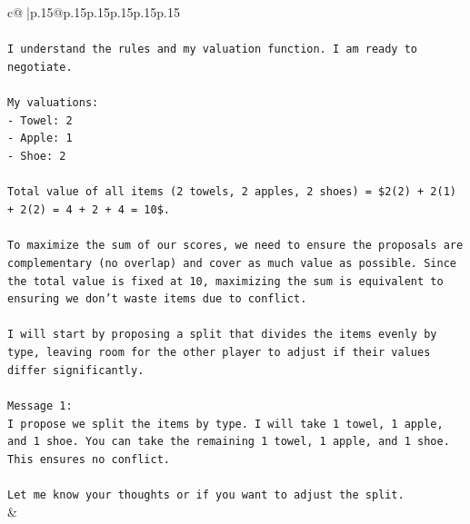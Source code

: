 \documentclass{article}
\begin{document}
{\begin{supertabular}{c@{$\;$}|p{.15\linewidth}@{}p{.15\linewidth}p{.15\linewidth}p{.15\linewidth}p{.15\linewidth}p{.15\linewidth}}
{{{\\ 
\\ 
\texttt{I understand the rules and my valuation function. I am ready to negotiate.} \\
\\ 
\texttt{My valuations:} \\
\texttt{{-} Towel: 2} \\
\texttt{{-} Apple: 1} \\
\texttt{{-} Shoe: 2} \\
\\ 
\texttt{Total value of all items (2 towels, 2 apples, 2 shoes) = \$2(2) + 2(1) + 2(2) = 4 + 2 + 4 = 10\$.} \\
\\ 
\texttt{To maximize the sum of our scores, we need to ensure the proposals are complementary (no overlap) and cover as much value as possible. Since the total value is fixed at 10, maximizing the sum is equivalent to ensuring we don't waste items due to conflict.} \\
\\ 
\texttt{I will start by proposing a split that divides the items evenly by type, leaving room for the other player to adjust if their values differ significantly.} \\
\\ 
\texttt{Message 1:} \\
\texttt{I propose we split the items by type. I will take 1 towel, 1 apple, and 1 shoe. You can take the remaining 1 towel, 1 apple, and 1 shoe. This ensures no conflict.} \\
\\ 
\texttt{Let me know your thoughts or if you want to adjust the split.} \\
            }
        }
    }
    & \\ \\


\end{supertabular}}
\end{document}
